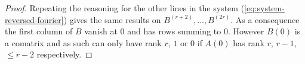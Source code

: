\documentclass[a4paper, 11pt]{article}
\begin{document}
\begin{proof}
  Repeating the reasoning for the other lines in the system (\ref{eq:system-reversed-fourier}) gives the same results on 
  $B^{(r+2)}, \ldots, B^{(2r)}$. As a consequence the first column of $B$ vanish at 0 and has rows summing to 0. However 
  $B(0)$ is a comatrix and as such can only have rank $r$, $1$ or $0$ if $A(0)$ has rank $r$, $r-1$, $\leq r-2$ 
  respectively. 

%
%
%
%

\end{proof}
\end{document}
